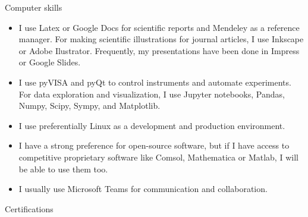 \documentclass[letterpaper, 11pt]{article}[leftmargin=*]
\renewcommand{\section}[2]{
  \colorbox{boxcol}{\color{secondary}\raggedbottom\normalsize{#1}{\hspace{2pt}#2}}
}
\newcommand{\resumeItemListStart}{\begin{itemize}[leftmargin=4.5mm]\itemsep-3pt}
\newcommand{\resumeItemListEnd}{\end{itemize}}
\newcommand{\resumeItem}[1]{
  \item\small{
    {#1}
  }
}
\begin{document}
\section{\faDesktop}{Computer skills}
\resumeItemListStart
\resumeItem{\footnotesize I use Latex or Google Docs for scientific reports and Mendeley as a reference manager. For making scientific illustrations for journal articles, I use Inkscape or Adobe Ilustrator. Frequently, my presentations have been done in Impress or Google Slides.}
\resumeItem{\footnotesize I use pyVISA and pyQt to control instruments and automate experiments. For data exploration and visualization, I use Jupyter notebooks, Pandas, Numpy, Scipy, Sympy, and Matplotlib.}
\resumeItem{\footnotesize I use preferentially Linux as a development and production environment.}
\resumeItem{\footnotesize I have a strong preference for open-source software, but if I have access to competitive proprietary software like Comsol, Mathematica or Matlab, I will be able to use them too.}
\resumeItem{\footnotesize I usually use Microsoft Teams for communication and collaboration.}
\resumeItemListEnd

\section{\faCertificate}{Certifications}
\end{document}
